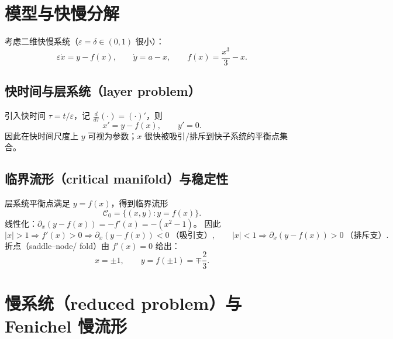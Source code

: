 \documentclass[a4paper,twoside,openany,UTF8]{article}  %
\numberwithin{equation}{section}  %
\numberwithin{equation}{section}  %
\begin{document}

\section{模型与快慢分解}

考虑二维快慢系统（$\varepsilon=\delta\in(0,1)$ 很小）：
\begin{equation}\label{eq:model}
	\varepsilon \dot x = y - f(x),\qquad \dot y = a-x,
	\qquad f(x)=\frac{x^3}{3}-x .
\end{equation}

\subsection{快时间与层系统（layer problem）}
引入快时间 $\tau=t/\varepsilon$，记 $\frac{d}{d\tau}(\cdot)=(\cdot)'$，则
\begin{equation}\label{eq:layer}
	x' = y-f(x),\qquad y'=0 .
\end{equation}
因此在快时间尺度上 $y$ 可视为参数；$x$ 很快被吸引/排斥到快子系统的平衡点集合。

\subsection{临界流形（critical manifold）与稳定性}
层系统平衡点满足 $y=f(x)$，得到临界流形
\begin{equation}\label{eq:C0}
	\mathcal C_0=\{(x,y): y=f(x)\}.
\end{equation}
线性化：$\partial_x(y-f(x)) = -f'(x)=-(x^2-1)$。
因此
\[
|x|>1\Rightarrow f'(x)>0 \Rightarrow \partial_x(y-f(x))<0 \ \text{（吸引支）},\qquad
|x|<1\Rightarrow \partial_x(y-f(x))>0 \ \text{（排斥支）}.
\]
折点（saddle--node/ fold）由 $f'(x)=0$ 给出：
\begin{equation}\label{eq:folds}
	x=\pm 1,\qquad y=f(\pm 1)=\mp\frac{2}{3}.
\end{equation}

\section{慢系统（reduced problem）与 Fenichel 慢流形}
\end{document}
